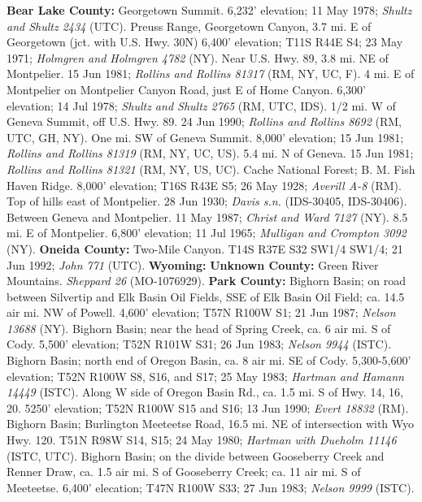   \textbf{Bear Lake County:}
Georgetown Summit. 6,232' elevation; 11 May 1978;
\textit{Shultz and Shultz 2434} (UTC).
Preuss Range, Georgetown Canyon, 3.7 mi. E of Georgetown
(jct. with U.S. Hwy. 30N) 6,400' elevation; T11S R44E S4; 23 May 1971;
\textit{Holmgren and Holmgren 4782} (NY).
Near U.S. Hwy. 89, 3.8 mi. NE of Montpelier. 15 Jun 1981;
\textit{Rollins and Rollins 81317} (RM, NY, UC, F).
4 mi. E of Montpelier on Montpelier Canyon Road, just E of Home Canyon.
6,300' elevation; 14 Jul 1978; \textit{Shultz and Shultz 2765} (RM, UTC, IDS).
1/2 mi. W of Geneva Summit, off U.S. Hwy. 89. 24 Jun 1990;
\textit{Rollins and Rollins 8692} (RM, UTC, GH, NY).
One mi. SW of Geneva Summit. 8,000' elevation; 15 Jun 1981;
\textit{Rollins and Rollins 81319} (RM, NY, UC, US).
5.4 mi. N of Geneva. 15 Jun 1981;
\textit{Rollins and Rollins 81321} (RM, NY, US, UC).
Cache National Forest; B. M. Fish Haven Ridge. 8,000' elevation; T16S R43E S5;
26 May 1928; \textit{Averill A-8} (RM).
Top of hills east of Montpelier. 28 Jun 1930;
\textit{Davis s.n.} (IDS-30405, IDS-30406).
Between Geneva and Montpelier. 11 May 1987; \textit{Christ and Ward 7127} (NY).
8.5 mi. E of Montpelier. 6,800' elevation; 11 Jul 1965;
\textit{Mulligan and Crompton 3092} (NY).
  \textbf{Oneida County:}
Two-Mile Canyon. T14S R37E S32 SW1/4 SW1/4; 21 Jun 1992;
\textit{John 771} (UTC).
  \textbf{Wyoming:}
  \textbf{Unknown County:}
Green River Mountains. \textit{Sheppard 26} (MO-1076929).
  \textbf{Park County:}
Bighorn Basin; on road between Silvertip and Elk Basin Oil Fields, SSE of Elk
Basin Oil Field; ca. 14.5 air mi. NW of Powell. 4,600' elevation;
T57N R100W S1; 21 Jun 1987; \textit{Nelson	13688} (NY).
Bighorn Basin; near the head of Spring Creek, ca. 6 air mi. S of Cody.
5,500' elevation; T52N R101W S31; 26 Jun 1983; \textit{Nelson 9944} (ISTC).
Bighorn Basin; north end of Oregon Basin, ca. 8 air mi. SE of Cody.
5,300-5,600' elevation; T52N R100W S8, S16, and S17; 25 May 1983;
\textit{Hartman and Hamann 14449} (ISTC).
Along W side of Oregon Basin Rd., ca. 1.5 mi. S of Hwy. 14, 16, 20.
5250' elevation; T52N R100W S15 and S16;	13 Jun 1990;
\textit{Evert 18832} (RM).
Bighorn Basin; Burlington Meeteetse Road, 16.5 mi. NE of intersection with
Wyo Hwy. 120. T51N R98W S14, S15; 24 May 1980;
\textit{Hartman with Dueholm 11146} (ISTC, UTC).
Bighorn Basin; on the divide between Gooseberry Creek and Renner Draw, ca.
1.5 air mi. S of Gooseberry Creek; ca. 11 air mi. S of Meeteetse.
6,400' elecation; T47N R100W S33; 27 Jun 1983; \textit{Nelson 9999} (ISTC).
